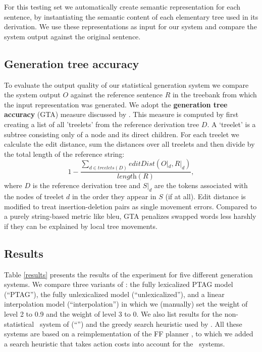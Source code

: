 For this testing set we automatically create semantic representation for each sentence, by instantiating the semantic content of each elementary tree used in its derivation. We use these representations as input for our system and compare the system output against the original sentence.


\subsection{Generation tree accuracy}
\label{ssec:eval-measures}
To evaluate the output quality of our statistical generation system we compare the system output $O$ against the reference sentence $R$ in the treebank from which the input representation was generated. We adopt the {\bf generation tree accuracy} (GTA) measure discussed by \cite{bangalorerambowwhittaker2001}.
This measure is computed by first creating a list of all 'treelets' from the reference derivation tree $D$. A `treelet' is a subtree consisting only of a node and its direct children. For each treelet we calculate the edit distance, sum the distances over all treelets and then divide by the total length of the reference string:
$$1 - \frac{\sum\limits_{d \in treelets(D)} editDist(O|_d, R|_d)}{\textit{length}(R)},$$
where $D$ is the reference derivation tree and $S|_d$ are the tokens associated with the nodes of treelet $d$ in the order they appear in $S$ (if at all).  Edit distance is modified to treat insertion-deletion pairs as single movement errors.  Compared to a purely string-based metric like {\sc bleu}, GTA penalizes swapped words less harshly if they can be explained by local tree movements.


\subsection{Results}

Table \ref{results} presents the results of the experiment for five different generation systems.  We compare three variants of \pcrisp: the fully lexicalized PTAG model (``PTAG''), the fully unlexicalized model (``unlexicalized''), and a linear interpolation model (``interpolation'') in which we (manually) set the weight of level 2 to 0.9 and the weight of level 3 to 0.  We also list results for the non-statistical \crisp\ system of   (``\crisp'') and the greedy search heuristic used by \spud.  All these systems are based on a reimplementation of the FF planner \cite{hoffmannnebel2001}, to which we added a search heuristic that takes action costs into account for the \pcrisp\ systems.

